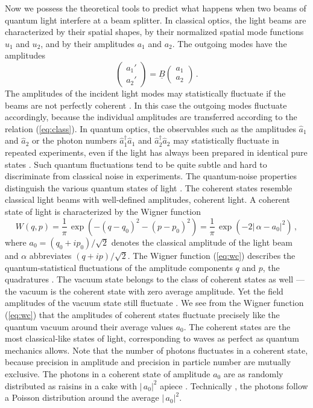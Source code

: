 \documentclass[12pt,amsmath,amssymb]{article}
\numberwithin{equation}{section}
\begin{document}
Now we possess the theoretical tools to predict what happens
when two beams of quantum light interfere at a beam splitter. In
classical optics, the light beams are characterized by their
spatial shapes, by their normalized spatial mode functions $u_1$
and $u_2$, and by their amplitudes $a_1$ and $a_2$. The outgoing
modes have the amplitudes
\begin{equation}
\label{eq:class} \left(
    \begin{array}{c}
     a_1'  \\
     a_2'
    \end{array}
\right) = \underline{B} \left(
    \begin{array}{c}
     a_1  \\
     a_2
    \end{array}
\right)\,.
\end{equation}
The amplitudes of the incident light modes may statistically
fluctuate if the beams are not perfectly coherent
\cite{BornWolf,MandelWolf}. In this case the outgoing modes
fluctuate accordingly, because the individual amplitudes are
transferred according to the relation (\ref{eq:class}). In
quantum optics, the observables such as the amplitudes
$\hat{a}_1$ and $\hat{a}_2$ or the photon numbers
$\hat{a}_1^\dagger\hat{a}_1$ and $\hat{a}_2^\dagger\hat{a}_2$ may
statistically fluctuate in repeated experiments, even if the
light has always been prepared in identical pure states
\cite{Leonhardt}. Such quantum fluctuations tend to be quite
subtle and hard to discriminate from classical noise in
experiments. The quantum-noise properties distinguish the various
quantum states of light \cite{Leonhardt}. The coherent states
\cite{Leonhardt} resemble classical light beams with well-defined
amplitudes, coherent light. A coherent state of light is
characterized by the Wigner function \cite{Leonhardt}
\begin{equation}
\label{eq:wc} W(q,p) =
\frac{1}{\pi}\,\exp\left(-(q-q_0)^2-(p-p_0)^2\right) =
\frac{1}{\pi}\,\exp\left(-2|\,\alpha-a_0|^2\right) \,,
\end{equation}
where $a_0=(q_0+ip_0)/\sqrt{2}$ denotes the classical amplitude
of the light beam and $\alpha$ abbreviates $(q+ip)/\sqrt{2}$. The
Wigner function (\ref{eq:wc}) describes the quantum-statistical
fluctuations of the amplitude components $q$ and $p$, the
quadratures \cite{Leonhardt}. The vacuum state belongs to the
class of coherent states as well \cite{Leonhardt} --- the vacuum
is the coherent state with zero average amplitude. Yet the field
amplitudes of the vacuum state still fluctuate \cite{Leonhardt}.
We see from the Wigner function (\ref{eq:wc}) that the amplitudes
of coherent states fluctuate precisely like the quantum vacuum
around their average values $a_0$. The coherent states are the
most classical-like states of light, corresponding to waves as
perfect as quantum mechanics allows. Note that the number of
photons fluctuates in a coherent state, because precision in
amplitude and precision in particle number are mutually
exclusive. The photons in a coherent state of amplitude $a_0$ are
as randomly distributed as raisins in a cake with $|\,a_0|^2$
apiece \cite{Leonhardt}. Technically \cite{Leonhardt}, the photons
follow a Poisson distribution around the average $|\,a_0|^2$.
\end{document}
